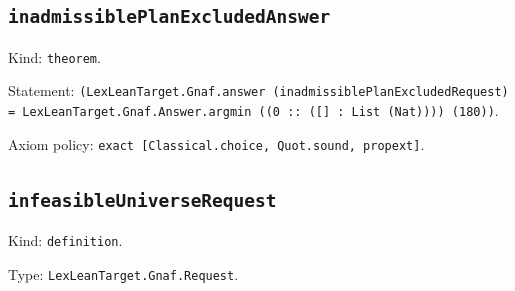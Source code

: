 \documentclass[11pt]{article}
\begin{document}
\subsection*{\texttt{inadmissiblePlanExcludedAnswer}}
\noindent Kind: \texttt{theorem}.\par
\noindent Statement: \texttt{(LexLeanTarget.Gnaf.answer (inadmissiblePlanExcludedRequest) = LexLeanTarget.Gnaf.Answer.argmin ((0 :: ([] : List (Nat)))) (180))}.\par
\noindent Axiom policy: \texttt{exact [Classical.choice, Quot.sound, propext]}.\par
\subsection*{\texttt{infeasibleUniverseRequest}}
\noindent Kind: \texttt{definition}.\par
\noindent Type: \texttt{LexLeanTarget.Gnaf.Request}.\par
\end{document}

